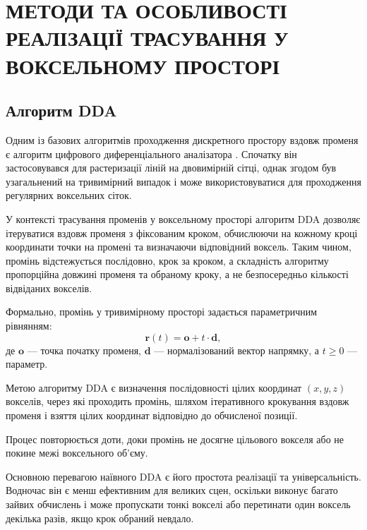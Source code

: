 \chapter{МЕТОДИ ТА ОСОБЛИВОСТІ РЕАЛІЗАЦІЇ \mbox{ТРАСУВАННЯ} У ВОКСЕЛЬНОМУ ПРОСТОРІ}

\section{Алгоритм DDA}

Одним із базових алгоритмів проходження дискретного простору вздовж променя є алгоритм цифрового диференціального аналізатора . Спочатку він застосовувався для растеризації ліній на двовимірній сітці, однак згодом був узагальнений на тривимірний випадок і може використовуватися для проходження регулярних воксельних сіток.

У контексті трасування променів у воксельному просторі алгоритм DDA дозволяє ітеруватися вздовж променя з фіксованим кроком, обчислюючи на кожному кроці координати точки на промені та визначаючи відповідний воксель. Таким чином, промінь відстежується послідовно, крок за кроком, а складність алгоритму пропорційна довжині променя та обраному кроку, а не безпосередньо кількості відвіданих вокселів.\cite{wiki:dda}

Формально, промінь у тривимірному просторі задається параметричним рівнянням:
\begin{equation*}
\mathbf{r}(t) = \mathbf{o} + t \cdot \mathbf{d},
\end{equation*}
де $\mathbf{o}$ — точка початку променя, $\mathbf{d}$ — нормалізований вектор напрямку, а $t \ge 0$ — параметр.

Метою алгоритму DDA є визначення послідовності цілих координат $(x, y, z)$ вокселів, через які проходить промінь, шляхом ітеративного крокування \linebreak вздовж променя і взяття цілих координат відповідно до обчисленої позиції.

\begin{figure}[ht]
    \centering
    
    \caption{}
    \label{fig:dda_2d}
\end{figure}

Процес повторюється доти, доки промінь не досягне цільового вокселя або не покине межі воксельного об'єму.

Основною перевагою наївного DDA є його простота реалізації та універсальність. Водночас він є менш ефективним для великих сцен, оскільки виконує багато зайвих обчислень і може пропускати тонкі вокселі або перетинати один воксель декілька разів, якщо крок обраний невдало.

